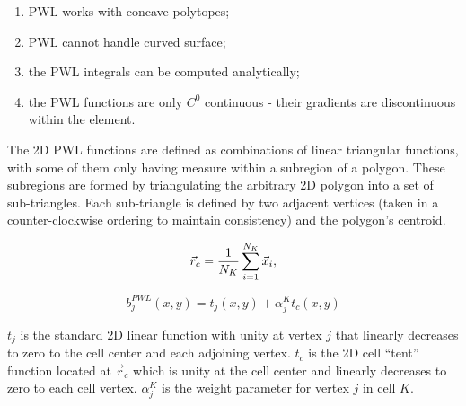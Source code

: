 \begin{enumerate}
\item PWL works with concave polytopes;
\item PWL cannot handle curved surface;
\item the PWL integrals can be computed analytically;
\item the PWL functions are only $C^0$ continuous - their gradients are discontinuous within the element.
\end{enumerate}

The 2D PWL functions are defined as combinations of linear triangular functions, with some of them only having measure within a subregion of a polygon. These subregions are formed by triangulating the arbitrary 2D polygon into a set of sub-triangles. Each sub-triangle is defined by two adjacent vertices (taken in a counter-clockwise ordering to maintain consistency) and the polygon's centroid.

\begin{equation}
\label{eq::PWL_2D_cell_center}
	\vec{r}_{c} = \frac{1}{N_K} \sum\displaylimits_{i=1}^{N_K} \vec{x}_i ,
\end{equation}

\begin{equation}
\label{eq::PWL_2D}
	b_j^{PWL} (x,y) = t_j (x,y) + \alpha_j^K t_c (x,y)
\end{equation}

\noindent $t_j$ is the standard 2D linear function with unity at vertex $j$ that linearly decreases to zero to the cell center and each adjoining vertex. $t_c$ is the 2D cell ``tent'' function located at $\vec{r}_{c}$ which is unity at the cell center and linearly decreases to zero to each cell vertex. $\alpha_{j}^{K}$ is the weight parameter for vertex $j$ in cell $K$. 


